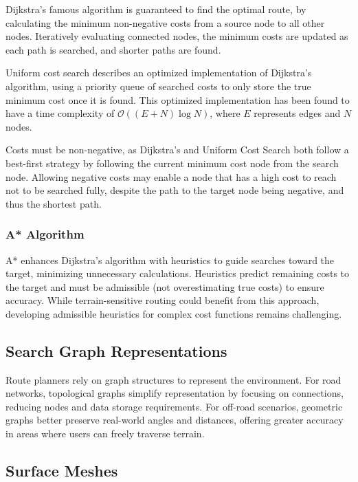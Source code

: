 \documentclass[12pt]{article}
\begin{document}
Dijkstra's famous algorithm \autocite{dijkstra1959} is guaranteed to find the optimal route, by calculating the minimum non-negative costs from a source node to all other nodes. Iteratively evaluating connected nodes, the minimum costs are updated as each path is searched, and shorter paths are found.

Uniform cost search describes an optimized implementation of Dijkstra's algorithm, using a priority queue of searched costs to only store the true minimum cost once it is found. This optimized implementation has been found to have a time complexity of $\mathcal{O} ((E + N) \log{N})$, where $E$ represents edges and $N$ nodes.

Costs must be non-negative, as Dijkstra's and Uniform Cost Search both follow a best-first strategy by following the current minimum cost node from the search node. Allowing negative costs may enable a node that has a high cost to reach not to be searched fully, despite the path to the target node being negative, and thus the shortest path.

\subsubsection{A* Algorithm}

A* enhances Dijkstra's algorithm with heuristics to guide searches toward the target, minimizing unnecessary calculations. Heuristics predict remaining costs to the target and must be admissible (not overestimating true costs) to ensure accuracy. While terrain-sensitive routing could benefit from this approach, developing admissible heuristics for complex cost functions remains challenging.

\subsection{Search Graph Representations}

Route planners rely on graph structures to represent the environment. For road networks, topological graphs simplify representation by focusing on connections, reducing nodes and data storage requirements. For off-road scenarios, geometric graphs better preserve real-world angles and distances, offering greater accuracy in areas where users can freely traverse terrain.

\subsection{Surface Meshes}
\end{document}
